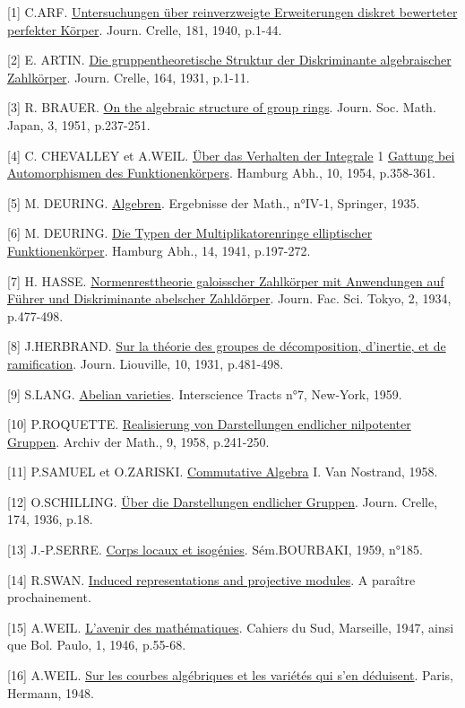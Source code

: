 \begin{center}\end{center}

[1] C.ARF. \uline{Untersuchungen über reinverzweigte Erweiterungen diskret bewerteter perfekter Körper}. Journ. Crelle, 181, 1940, p.1-44.

[2] E. ARTIN. \uline{Die gruppentheoretische Struktur der Diskriminante algebraischer Zahlkörper}. Journ. Crelle, 164, 1931, p.1-11.

[3] R. BRAUER. \uline{On the algebraic structure of group rings}. Journ. Soc. Math. Japan, 3, 1951, p.237-251.

[4] C. CHEVALLEY et A.WEIL. \uline{Über das Verhalten der Integrale} 1 \uline{Gattung bei Automorphismen des Funktionenkörpers}. Hamburg Abh., 10, 1954, p.358-361.

[5] M. DEURING. \uline{Algebren}. Ergebnisse der Math., n°IV-1, Springer, 1935.

[6] M. DEURING. \uline{Die Typen der Multiplikatorenringe elliptischer Funktionenkörper}. Hamburg Abh., 14, 1941, p.197-272.

[7] H. HASSE. \uline{Normenresttheorie galoisscher Zahlkörper mit Anwendungen auf Führer und Diskriminante abelscher Zahldörper}. Journ. Fac. Sci. Tokyo, 2, 1934, p.477-498.

[8] J.HERBRAND. \uline{Sur la théorie des groupes de décomposition, d'inertie, et de ramification}. Journ. Liouville, 10, 1931, p.481-498.

[9] S.LANG. \uline{Abelian varieties}. Interscience Tracts n°7, New-York, 1959.

[10] P.ROQUETTE. \uline{Realisierung von Darstellungen endlicher nilpotenter Gruppen}. Archiv der Math., 9, 1958, p.241-250.

[11] P.SAMUEL et O.ZARISKI. \uline{Commutative Algebra} I. Van Nostrand, 1958.

[12] O.SCHILLING. \uline{Über die Darstellungen endlicher Gruppen}. Journ. Crelle, 174, 1936, p.18.

[13] J.-P.SERRE. \uline{Corps locaux et isogénies}. Sém.BOURBAKI, 1959, n°185.

[14] R.SWAN. \uline{Induced representations and projective modules}. A paraître prochainement.

[15] A.WEIL. \uline{L'avenir des mathématiques}. Cahiers du Sud, Marseille, 1947, ainsi que Bol.  Paulo, 1, 1946, p.55-68.

[16] A.WEIL. \uline{Sur les courbes algébriques et les variétés qui s'en déduisent}. Paris, Hermann, 1948.

